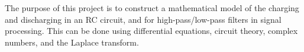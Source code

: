 The purpose of this project is to construct a mathematical model of the charging and discharging in an RC circuit, and for high-pass/low-pass filters in signal processing. This can be done using differential equations, circuit theory, complex numbers, and the Laplace transform.